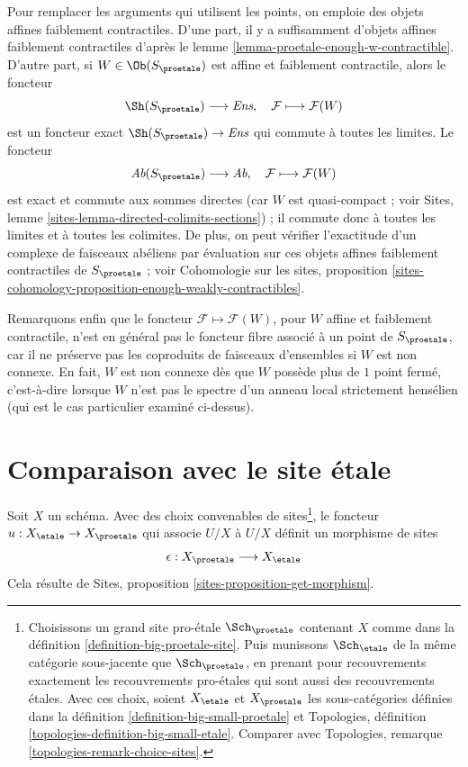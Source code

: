 \medskip\noindent
Pour remplacer les arguments qui utilisent les points, on emploie des objets affines
faiblement contractiles.
D'une part, il y a suffisamment d'objets affines faiblement contractiles d'après le
lemme \ref{lemma-proetale-enough-w-contractible}.
D'autre part, si $W \in \Ob(S_\proetale)$ est affine et faiblement contractile,
alors le foncteur
$$
\Sh(S_\proetale) \longrightarrow \textit{Ens},\quad
\mathcal{F} \longmapsto \mathcal{F}(W)
$$
est un foncteur exact $\Sh(S_\proetale) \to \textit{Ens}$ qui commute
à toutes les limites. Le foncteur
$$
\textit{Ab}(S_\proetale) \longrightarrow \textit{Ab},\quad
\mathcal{F} \longmapsto \mathcal{F}(W)
$$
est exact et commute aux sommes directes (car $W$ est quasi-compact ; voir
Sites, lemme \ref{sites-lemma-directed-colimits-sections}) ; il
commute donc à toutes les limites et à toutes les colimites. De plus, on peut vérifier l'exactitude d'un
complexe de faisceaux abéliens par évaluation sur ces objets affines
faiblement contractiles de $S_\proetale$ ; voir
Cohomologie sur les sites, proposition
\ref{sites-cohomology-proposition-enough-weakly-contractibles}.

\medskip\noindent
Remarquons enfin que le foncteur $\mathcal{F} \mapsto \mathcal{F}(W)$,
pour $W$ affine et faiblement contractile, n'est en général pas le foncteur fibre associé à un
point de $S_\proetale$, car il ne préserve pas les coproduits de faisceaux
d'ensembles si $W$ est non connexe. En fait, $W$ est non connexe dès que $W$
possède plus de $1$ point fermé, c'est-à-dire lorsque $W$ n'est pas le spectre d'un
anneau local strictement hensélien (qui est le cas particulier examiné ci-dessus).





\section{Comparaison avec le site \'etale}
\label{section-comparison}

\noindent
Soit $X$ un schéma. Avec des choix convenables de sites\footnote{Choisissons
un grand site pro-\'etale $\Sch_\proetale$ contenant $X$ comme dans la
définition \ref{definition-big-proetale-site}. Puis munissons $\Sch_\etale$
de la même catégorie sous-jacente que $\Sch_\proetale$, en prenant
pour recouvrements exactement les recouvrements pro-\'etales qui sont aussi des
recouvrements \'etales. Avec ces choix, soient $X_\etale$ et $X_\proetale$
les sous-catégories définies dans
la définition \ref{definition-big-small-proetale} et
Topologies, définition \ref{topologies-definition-big-small-etale}.
Comparer avec
Topologies, remarque \ref{topologies-remark-choice-sites}.},
le foncteur $u : X_\etale \to X_\proetale$ qui associe
$U/X$ à $U/X$ définit un morphisme de sites
$$
\epsilon : X_\proetale \longrightarrow X_\etale
$$
Cela résulte de Sites, proposition \ref{sites-proposition-get-morphism}.

